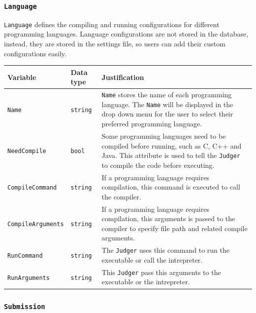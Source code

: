 \documentclass[a4paper]{report}
\begin{document}
\subsubsection{\texttt{Language}}

\texttt{Language} defines the compiling and running configurations for different programming languages. Language configurations are not stored in the database, instead, they are stored in the settings file, so users can add their custom configurations easily.

\begin{tabulary}{\textwidth}{|l|l|L|}
    \hline
    Variable & Data type & Justification \\
    \hline
    \texttt{Name} & \texttt{string} & \texttt{Name} stores the name of each programming language. The \texttt{Name} will be displayed in the drop down menu for the user to select their preferred programming language. \\
    \hline
    \texttt{NeedCompile} & \texttt{bool} & Some programming languages need to be compiled before running, such as C, C++ and Java. This attribute is used to tell the \texttt{Judger} to compile the code before executing. \\
    \hline
    \texttt{CompileCommand} & \texttt{string} & If a programming language requires compilation, this command is executed to call the compiler. \\
    \hline
    \texttt{CompileArguments} & \texttt{string} & If a programming language requires compilation, this arguments is passed to the compiler to specify file path and related compile arguments. \\
    \hline
    \texttt{RunCommand} & \texttt{string} & The \texttt{Judger} uses this command to run the executable or call the intrepreter. \\
    \hline
    \texttt{RunArguments} & \texttt{string} & This \texttt{Judger} pass this arguments to the executable or the intrepreter. \\
    \hline
\end{tabulary}

\subsubsection{\texttt{Submission}}
\end{document}
